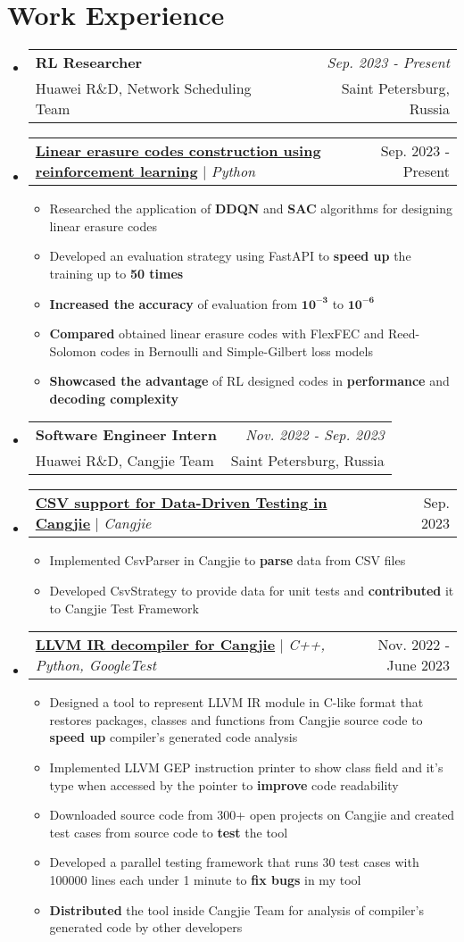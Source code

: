 \documentclass[english,russian,letterpaper,11pt]{article}
\makeatletter
\newcommand{\resumeItem}[1]{
  \item\small{
    {#1 \vspace{-2pt}}
  }
}
\newcommand{\resumeWorkExpHeading}[4]{
  \vspace{-2pt}\item
    \begin{tabular*}{0.97\textwidth}[t]{l@{\extracolsep{\fill}}r}
      \textbf{#1} & \textit{#2} \\
      #3 & #4 \\
    \end{tabular*}\vspace{-7pt}
}
\newcommand{\resumeProjectHeading}[2]{
    \item
    \begin{tabular*}{0.97\textwidth}{l@{\extracolsep{\fill}}r}
      \small#1 & #2 \\
    \end{tabular*}\vspace{-7pt}
}
\newcommand{\resumeSubHeadingListStart}{\begin{itemize}[leftmargin=0.15in, label={}]}
\newcommand{\resumeSubHeadingListEnd}{\end{itemize}}
\newcommand{\resumeItemListStart}{\begin{itemize}}
\newcommand{\resumeItemListEnd}{\end{itemize}\vspace{-5pt}}
\makeatother
\begin{document}
\section{Work Experience}
    \resumeSubHeadingListStart
    \resumeWorkExpHeading
      {RL Researcher}{Sep. 2023 - Present}
      {Huawei R\&D, Network Scheduling Team}{Saint Petersburg, Russia}
    \resumeProjectHeading
          {\underline{\textbf{Linear erasure codes construction using reinforcement learning}} $|$ \emph{Python}}{Sep. 2023 - Present}
          \resumeItemListStart
            \resumeItem{Researched the application of \textbf{DDQN} and \textbf{SAC} algorithms for designing linear erasure codes}
            \resumeItem{Developed an evaluation strategy using FastAPI to \textbf{speed up} the training up to \textbf{50 times}}
            \resumeItem{\textbf{Increased the accuracy} of evaluation from $\mathbf{10^{-3}}$ to $\mathbf{10^{-6}}$}
            \resumeItem{\textbf{Compared} obtained linear erasure codes with FlexFEC and Reed-Solomon codes in Bernoulli and Simple-Gilbert loss models}
            \resumeItem{\textbf{Showcased the advantage} of RL designed codes in \textbf{performance} and \textbf{decoding complexity}}
          \resumeItemListEnd  
    \resumeWorkExpHeading
      {Software Engineer Intern}{Nov. 2022 - Sep. 2023}
      {Huawei R\&D, Cangjie Team}{Saint Petersburg, Russia}
    \resumeProjectHeading
          {\underline{\textbf{CSV support for Data-Driven Testing in Cangjie}} $|$ \emph{Cangjie}}{Sep. 2023}
          \resumeItemListStart
            \resumeItem{Implemented CsvParser in Cangjie to \textbf{parse} data from CSV files}
            \resumeItem{Developed CsvStrategy to provide data for unit tests and \textbf{contributed} it to Cangjie Test Framework}
          \resumeItemListEnd
    \resumeProjectHeading
          {\underline{\textbf{LLVM IR decompiler for Cangjie}} $|$ \emph{C++, Python, GoogleTest}}{Nov. 2022 - June 2023}
          \resumeItemListStart
            \resumeItem{Designed a tool to represent LLVM IR module in C-like format that restores packages, classes and functions from Cangjie source code to \textbf{speed up} compiler's generated code analysis}
            \resumeItem{Implemented LLVM GEP instruction printer to show class field and it's type when accessed by the pointer to \textbf{improve} code readability}
            \resumeItem{Downloaded source code from 300+ open projects on Cangjie and created test cases from source code to \textbf{test} the tool}
            \resumeItem{Developed a parallel testing framework that runs 30 test cases with 100000 lines each under 1 minute to \textbf{fix bugs} in my tool}
            \resumeItem{\textbf{Distributed} the tool inside Cangjie Team for analysis of compiler's generated code by other developers}
          \resumeItemListEnd
    \resumeSubHeadingListEnd
\end{document}

